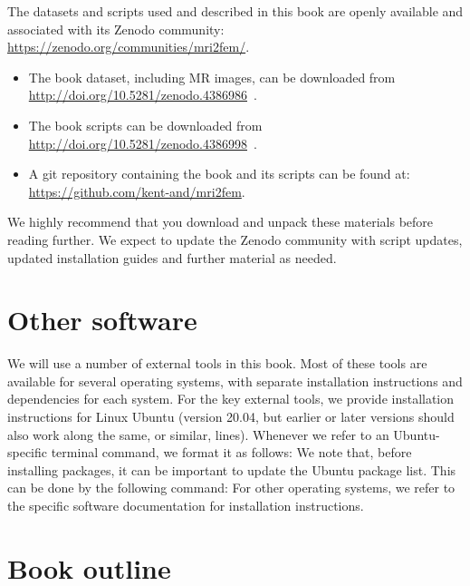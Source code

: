 
The datasets and scripts used and described in this book are openly
available and associated with its Zenodo community:
\url{https://zenodo.org/communities/mri2fem/}. 
\begin{itemize}
\item
  The book dataset, including MR images, can be downloaded from \\
  \url{http://doi.org/10.5281/zenodo.4386986}~\cite{kent_andre_mardal_2020_4386986}.
\item
  The book scripts can be downloaded from \\
  \url{http://doi.org/10.5281/zenodo.4386998}~\cite{kent_andre_mardal_2020_4386998}.
\item 
  A git repository containing the book and its scripts can be found 
  at: \\ \url{https://github.com/kent-and/mri2fem}.
\end{itemize}
We highly recommend that you download and unpack these materials
before reading further. We expect to update the Zenodo community with
script updates, updated installation guides and further material as
needed.
 
\section{Other software}
We will use a number of external tools in this book. Most of these
tools are available for several operating systems, with separate
installation instructions and dependencies for each system. For the
key external tools, we provide installation instructions for Linux
Ubuntu (version 20.04, but earlier or later versions should also work
along the same, or similar, lines). Whenever we refer to an Ubuntu-specific 
terminal command, we format it as follows:
\noindent We note that, before installing packages, it can be important to update
the Ubuntu package list. This can be done by the following command:
\noindent For other operating systems, we refer to the specific
software documentation for installation instructions.

\section{Book outline}


